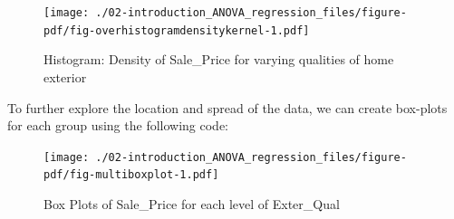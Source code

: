 \documentclass[
  letterpaper,
  DIV=11,
  numbers=noendperiod]{scrreprt}
\newenvironment{Shaded}{\begin{snugshade}}{\end{snugshade}}
\newcommand{\AttributeTok}[1]{\textcolor[rgb]{0.40,0.45,0.13}{#1}}
\newcommand{\DecValTok}[1]{\textcolor[rgb]{0.68,0.00,0.00}{#1}}
\newcommand{\FunctionTok}[1]{\textcolor[rgb]{0.28,0.35,0.67}{#1}}
\newcommand{\NormalTok}[1]{\textcolor[rgb]{0.00,0.23,0.31}{#1}}
\newcommand{\SpecialCharTok}[1]{\textcolor[rgb]{0.37,0.37,0.37}{#1}}
\newcommand{\StringTok}[1]{\textcolor[rgb]{0.13,0.47,0.30}{#1}}
\begin{document}
\begin{figure}[H]

{\centering \texttt{[image: ./02-introduction\_ANOVA\_regression\_files/figure-pdf/fig-overhistogramdensitykernel-1.pdf]}

}

\caption{\label{fig-overhistogramdensitykernel}Histogram: Density of
Sale\_Price for varying qualities of home exterior}

\end{figure}

To further explore the location and spread of the data, we can create
box-plots for each group using the following code:

\begin{Shaded}
\end{Shaded}

\begin{figure}[H]

{\centering \texttt{[image: ./02-introduction\_ANOVA\_regression\_files/figure-pdf/fig-multiboxplot-1.pdf]}

}

\caption{\label{fig-multiboxplot}Box Plots of Sale\_Price for each level
of Exter\_Qual}

\end{figure}
\end{document}
